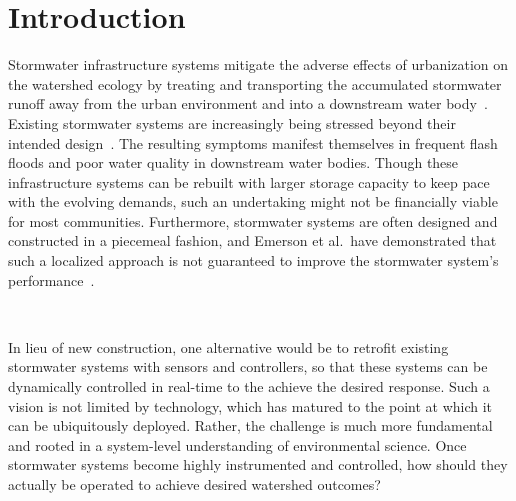 \chapter{Introduction}\label{ch:introduction}
Stormwater infrastructure systems mitigate the adverse effects of urbanization on the watershed ecology by treating and transporting the accumulated stormwater runoff away from the urban environment and into a downstream water body~\cite{national2009urban}.
Existing stormwater systems are increasingly being stressed beyond their intended design~\cite{kerkez2016, national2009urban}.
The resulting symptoms manifest themselves in frequent flash floods\cite{LarisKarklisBefore-and-afterPost} and poor water quality in downstream water bodies\cite{Watson2016TheHypoxia}.
Though these infrastructure systems can be rebuilt with larger storage capacity to keep pace with the evolving demands, such an undertaking might not be financially viable for most communities\cite{kerkez2016}.
Furthermore, stormwater systems are often designed and constructed in a piecemeal fashion, and Emerson et al.\ have demonstrated that such a localized approach is not guaranteed to improve the stormwater system's performance~\cite{Emerson2005Watershed-ScaleBasins}.

\

In lieu of new construction, one alternative would be to retrofit existing stormwater systems with sensors and controllers, so that these systems can be dynamically controlled in real-time to the achieve the desired response\cite{kerkez2016, Mullapudi_Wong_Kerkez_2017}. 
Such a vision is not limited by technology, which has matured to the point at which it can be ubiquitously deployed\cite{Bartos_2018}.
Rather, the challenge is much more fundamental and rooted in a system-level understanding of environmental science.
Once stormwater systems become highly instrumented and controlled, how should they actually be operated to achieve desired watershed outcomes?

\

